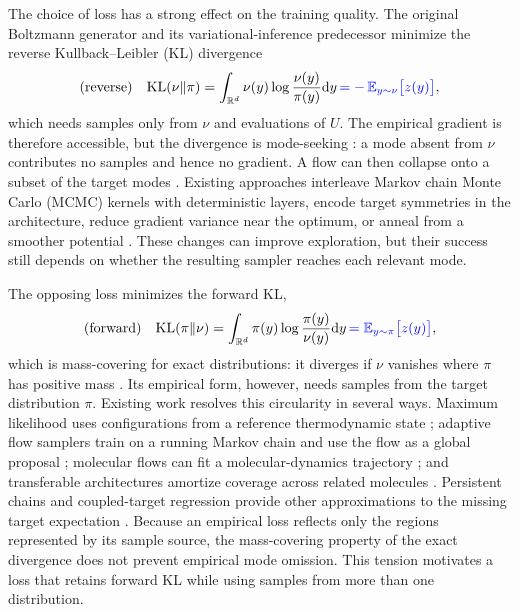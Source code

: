 \documentclass{article}
\begin{document}
The choice of loss has a strong effect on the training quality. The original Boltzmann generator \citep{noe2019boltzmann} and its variational-inference predecessor \citep{rezende2015variational} minimize the reverse Kullback--Leibler (KL) divergence
\begin{equation}
    \text{(reverse)}\quad \mathrm{KL}(\nu\|\pi) = \int_{\mathbb R^d} \nu(y) \log \frac{\nu(y)}{\pi(y)} \mathrm{d} y \,{\color{blue}= -\,\mathbb E_{y\sim\nu}\bigl[z(y)\bigr]},
    \label{eq: reverse KL}
\end{equation}
which needs samples only from $\nu$ and evaluations of $U$. The empirical gradient is therefore accessible, but the divergence is mode-seeking \citep{wainwright2008graphical}: a mode absent from $\nu$ contributes no samples and hence no gradient. A flow can then collapse onto a subset of the target modes \citep{wu2020stochastic,felardos2023designing}. Existing approaches interleave Markov chain Monte Carlo (MCMC) kernels with deterministic layers, encode target symmetries in the architecture, reduce gradient variance near the optimum, or anneal from a smoother potential \citep{wu2020stochastic,kohler2020equivariant,vaitl2022gradients,schopmans2025temperature}. These changes can improve exploration, but their success still depends on whether the resulting sampler reaches each relevant mode.

The opposing loss minimizes the forward KL,
\begin{equation}
    \text{(forward)}\quad \mathrm{KL}(\pi\|\nu) = \int_{\mathbb R^d} \pi(y) \log \frac{\pi(y)}{\nu(y)} \mathrm{d} y \,{\color{blue}= \mathbb E_{y\sim\pi}\bigl[z(y)\bigr]},
    \label{eq: forward KL}
\end{equation}
which is mass-covering for exact distributions: it diverges if $\nu$ vanishes where $\pi$ has positive mass \citep{wainwright2008graphical}. Its empirical form, however, needs samples from the target distribution $\pi$. Existing work resolves this circularity in several ways. Maximum likelihood uses configurations from a reference thermodynamic state \citep{wirnsberger2020targeted}; adaptive flow samplers train on a running Markov chain and use the flow as a global proposal \citep{gabrie2022adaptive}; molecular flows can fit a molecular-dynamics trajectory \citep{klein2023equivariant}; and transferable architectures amortize coverage across related molecules \citep{klein2024transferable}. Persistent chains and coupled-target regression provide other approximations to the missing target expectation \citep{naesseth2020markovian,rehman2026regflow}. Because an empirical loss reflects only the regions represented by its sample source, the mass-covering property of the exact divergence does not prevent empirical mode omission. This tension motivates a loss that retains forward KL while using samples from more than one distribution.
\end{document}
